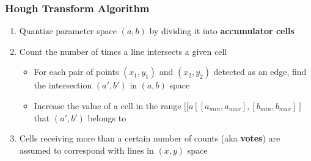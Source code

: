 \documentclass[letterpaper,12pt]{article}
\begin{document}
\subsubsection{Hough Transform Algorithm}
\begin{enumerate}
 \item Quantize parameter space $(a,b)$ by dividing it into \textbf{accumulator cells}
 \item Count the number of times a line intersects a given cell
       \begin{itemize}
        \item For each pair of points $(x_1,y_1)$ and $(x_2,y_2)$ detected as an edge, find the intersection $(a',b')$ in $(a,b)$ space
        \item Increase the value of a cell in the range $[[a[[a_{min}, a_{max}],[b_{min},b_{max}]]$ that $(a', b')$ belongs to
       \end{itemize}
 \item Cells receiving more than a certain number of counts (aka \textbf{votes}) are assumed to correspond with lines in $(x,y)$ space
\end{enumerate}
\end{document}
